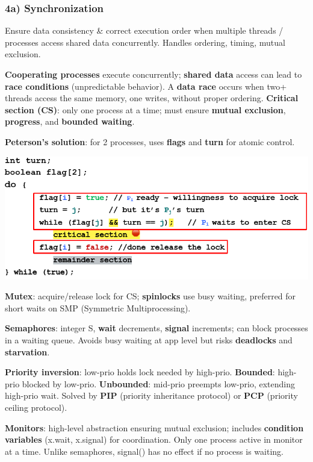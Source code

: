 \subsubsection*{4a) Synchronization}

Ensure data consistency \& correct execution order when multiple threads / processes access shared data concurrently. Handles ordering, timing, mutual exclusion.

\textbf{Cooperating processes} execute concurrently; \textbf{shared data} access can lead to \textbf{race conditions} (unpredictable behavior). A \textbf{data race} occurs when two+ threads access the same memory, one writes, without proper ordering. \textbf{Critical section (CS)}: only one process at a time; must ensure \textbf{mutual exclusion}, \textbf{progress}, and \textbf{bounded waiting}.  

\textbf{Peterson's solution}: for 2 processes, uses \textbf{flags} and \textbf{turn} for atomic control.

\includegraphics[width=0.95\linewidth]{images/04a_p17_peterson.png}

\textbf{Mutex}: acquire/release lock for CS; \textbf{spinlocks} use busy waiting, preferred for short waits on SMP (Symmetric Multiprocessing).

\textbf{Semaphores}: integer S, \textbf{wait} decrements, \textbf{signal} increments; can block processes in a waiting queue. Avoids busy waiting at app level but risks \textbf{deadlocks} and \textbf{starvation}.

\textbf{Priority inversion}: low-prio holds lock needed by high-prio. 
\textbf{Bounded}: high-prio blocked by low-prio.
\textbf{Unbounded}: mid-prio preempts low-prio, extending high-prio wait. Solved by \textbf{PIP} (priority inheritance protocol) or \textbf{PCP} (priority ceiling protocol).

\textbf{Monitors}: high-level abstraction ensuring mutual exclusion; includes \textbf{condition variables} (x.wait, x.signal) for coordination.
Only one process active in monitor at a time.
Unlike semaphores, signal() has no effect if no process is waiting. 

